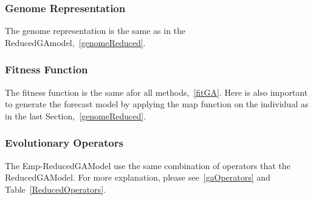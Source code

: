 \subsubsection{Genome Representation}
The genome representation is the same as in the ReducedGAmodel,~\ref{genomeReduced}. \\

\subsubsection{Fitness Function}
The fitness function is the same afor all methods,~\ref{fitGA}. Here is also important to generate the forecast model by applying the map function on the individual as in the last Section,~\ref{genomeReduced}.\\

\subsubsection{Evolutionary Operators}
The Emp-ReducedGAModel use the same combination of operators that the ReducedGAModel. For more explanation, please see~\ref{gaOperators} and Table~\ref{ReducedOperators}.\\

